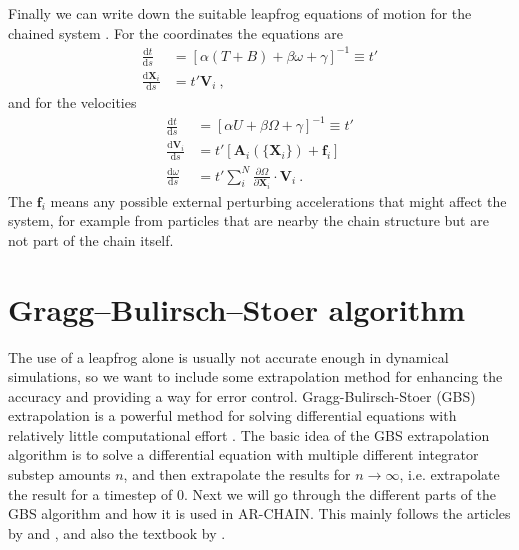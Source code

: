 \documentclass[english, oneside]{HYgradu}
\begin{document}
Finally we can write down the suitable leapfrog equations of motion for the chained system \citep{mikkola:2008b}. For the coordinates the equations are
\begin{equation}
\begin{aligned}
\frac{\mathrm{d}t}{\mathrm{d}s} &= [\alpha (T + B) + \beta \omega + \gamma]^{-1} \equiv t' \\
\frac{\mathrm{d}\boldsymbol{X}_i}{\mathrm{d}s} &= t' \boldsymbol{V}_i \ ,
\end{aligned}
\end{equation}
and for the velocities
\begin{equation}
\begin{aligned}
\frac{\mathrm{d}t}{\mathrm{d}s} &= [\alpha U + \beta \Omega + \gamma]^{-1} \equiv t' \\
\frac{\mathrm{d}\boldsymbol{V}_i}{\mathrm{d}s} &= t' [ \boldsymbol{A}_i(\{ \boldsymbol{X}_i \}) + \boldsymbol{f}_i ] \\
\frac{\mathrm{d} \omega}{\mathrm{d}s} &= t' \sum_i^N \frac{\partial \Omega}{\partial \boldsymbol{X}_i} \cdot \boldsymbol{V}_i \ .
\end{aligned} \label{equ:VelocityEomChained}
\end{equation}
The $\boldsymbol{f}_i$ means any possible external perturbing accelerations that might affect the system, for example from particles that are nearby the chain structure but are not part of the chain itself.

\section{Gragg–Bulirsch–Stoer algorithm}

The use of a leapfrog alone is usually not accurate enough in dynamical simulations, so we want to include some extrapolation method for enhancing the accuracy and providing a way for error control. Gragg-Bulirsch-Stoer (GBS) extrapolation is a powerful method for solving differential equations with relatively little computational effort \citep{gragg:1965, bulirsch:1966}. The basic idea of the GBS extrapolation algorithm is to solve a differential equation with multiple different integrator substep amounts $n$, and then extrapolate the results for $n \rightarrow \infty$, i.e. extrapolate the result for a timestep of 0. Next we will go through the different parts of the GBS algorithm and how it is used in AR-CHAIN. This mainly follows the articles by \cite{gragg:1965} and \cite{bulirsch:1966}, and also the textbook by \cite{press:2007}.
\end{document}

